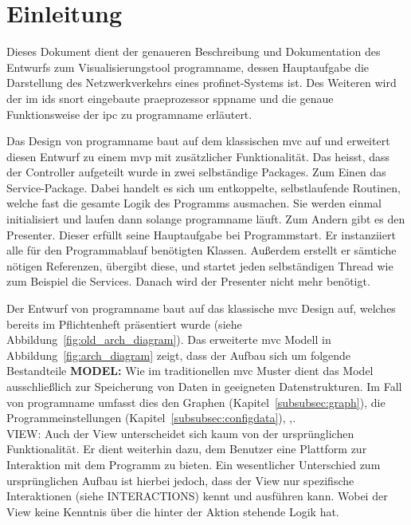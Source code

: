 \chapter{Einleitung}
Dieses Dokument dient der genaueren Beschreibung und Dokumentation des Entwurfs zum Visualisierungstool \gls{programname}, dessen Hauptaufgabe die Darstellung des Netzwerkverkehrs eines \gls{profinet}-Systems ist. Des Weiteren wird der im \gls{ids} \gls{snort} eingebaute \gls{praeprozessor} \gls{sppname} und die genaue Funktionsweise der \gls{ipc} zu \gls{programname} erläutert.\newline
\newline


Das Design von \gls{programname} baut auf dem klassischen \gls{mvc} auf und erweitert diesen Entwurf zu einem \gls{mvp} mit zusätzlicher Funktionalität. Das heisst, dass der Controller aufgeteilt wurde in zwei selbständige Packages. Zum Einen das Service-Package. Dabei handelt es sich um entkoppelte, selbstlaufende Routinen, welche fast die gesamte Logik des Programms ausmachen. Sie werden einmal initialisiert und laufen dann solange \gls{programname} läuft. Zum Andern gibt es den Presenter. Dieser erfüllt seine Hauptaufgabe bei Programmstart. Er instanziiert alle für den Programmablauf benötigten Klassen. Außerdem erstellt er sämtiche nötigen Referenzen, übergibt diese, und startet jeden selbständigen Thread wie zum Beispiel die Services. Danach wird der Presenter nicht mehr benötigt.

Der Entwurf von \gls{programname} baut auf das klassische \gls{mvc} Design auf, welches bereits im Pflichtenheft präsentiert wurde (siehe Abbildung~\ref{fig:old_arch_diagram}). Das erweiterte \gls{mvc} Modell in Abbildung~\ref{fig:arch_diagram} zeigt, dass der Aufbau sich um folgende Bestandteile
\newline\newline
\textbf{MODEL:}\newline
Wie im traditionellen \gls{mvc} Muster dient das Model ausschließlich zur Speicherung von Daten in geeigneten Datenstrukturen. Im Fall von \gls{programname} umfasst dies den Graphen (Kapitel~\ref{subsubsec:graph}), die Programmeinstellungen (Kapitel~\ref{subsubsec:configdata}), ,.
\\
VIEW:
Auch der View unterscheidet sich kaum von der ursprünglichen Funktionalität. Er dient weiterhin dazu, dem Benutzer eine Plattform zur Interaktion mit dem Programm zu bieten. Ein wesentlicher Unterschied zum ursprünglichen Aufbau ist hierbei jedoch, dass der View nur spezifische Interaktionen (siehe INTERACTIONS) kennt und ausführen kann. Wobei der View keine Kenntnis über die hinter der Aktion stehende Logik hat.

